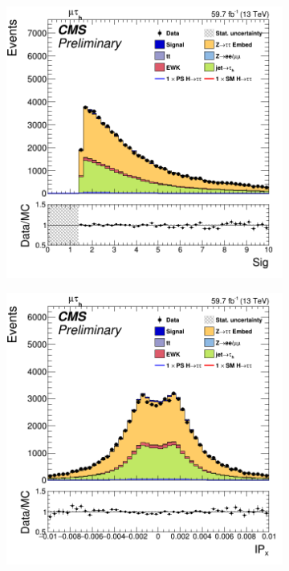 \begin{figure}[!ht]
\begin{subfigure}[b]{\linewidth}
    \centering
    \includegraphics[scale=0.3]{Chapitre7/Images/MuonIPsig.png} 
    \caption{} 
    \vspace{0.5ex}
  \end{subfigure}
  \begin{subfigure}[b]{0.33\linewidth}
    \centering
    \includegraphics[width=\linewidth]{Chapitre7/Images/MuonIPx.png} 

\end{subfigure}
\end{figure}
